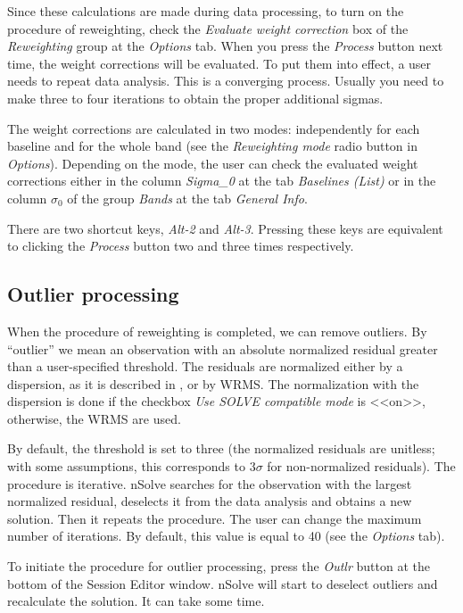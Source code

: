 \documentclass [10pt,letterpaper]{report}
\newcommand{\nuSolve}{\greektext n\latintext Solve}
\begin{document}
Since these calculations are made during data processing,
to turn on the procedure of reweighting, check the {\sl Evaluate
weight correction} box of the {\sl Reweighting} group at the {\sl
Options} tab. When you press the {\sl Process} button next time,
the weight corrections will be evaluated. To put them into effect, a
user needs to repeat data analysis. This is a converging process.
Usually you need to make three to four iterations to obtain the proper
additional sigmas.

The weight corrections are calculated in two modes: independently for
each baseline and for the whole band (see the {\sl Reweighting mode}
radio button in {\sl Options}). Depending on the mode, the user can
check the evaluated weight corrections either in the column {\sl
Sigma\_0} at the tab {\sl Baselines (List)} or in the column
{\bf $\sigma_0$} of the group {\sl Bands} at the tab {\sl General
Info}.

There are two shortcut keys, {\sl Alt-2} and {\sl Alt-3}.
Pressing these keys are equivalent to clicking the {\sl Process}
button two and three times respectively.



\subsection{Outlier processing}
When the procedure of reweighting is completed, we can remove outliers.
By ``outlier'' we mean an observation with an absolute normalized
residual greater than a user-specified threshold. The residuals are
normalized either by a dispersion, as it is described in \cite{Petrov1997},
or by WRMS. The normalization with the dispersion
is done if the checkbox {\sl Use SOLVE compatible mode} is <<on>>,
otherwise, the WRMS are used.

By default, the
threshold is set to three (the normalized residuals are unitless; with
some assumptions, this corresponds to $3\sigma$ for non-normalized
residuals). The procedure is iterative. \nuSolve{} searches for the
observation with the largest normalized residual, deselects it from the
data analysis and obtains a new solution. Then it repeats the procedure.
The user can change the maximum number of iterations. By default, this
value is equal to 40 (see the {\sl Options} tab).

To initiate the procedure for outlier processing, press the {\sl
Outlr} button at the bottom of the Session Editor window. \nuSolve{}
will start to deselect outliers and recalculate the solution. It can
take some time.
\end{document}
